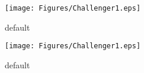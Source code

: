 \documentclass[11.7pt]{article}
\begin{document}
\begin{figure}[ht]
   \begin{minipage}[b]{0.48\linewidth}
      \centering
      \texttt{[image: Figures/Challenger1.eps]}
      \caption{default}
      \label{fig:figure1}
   \end{minipage}
   \hspace{0.2cm}
   \begin{minipage}[b]{0.48\linewidth}
      \centering
      \texttt{[image: Figures/Challenger1.eps]}
      \caption{default}
      \label{fig:figure2}
   \end{minipage}
\end{figure}
\end{document}
